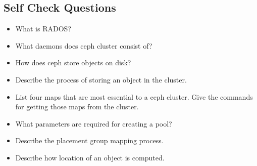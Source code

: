 \documentclass[12pt,a4paper]{report}
\begin{document}
\subsection{Self Check Questions}

\begin{itemize}
	\item What is RADOS?

	\item What daemons does ceph cluster consist of?

	\item How does ceph store objects on disk?

	\item Describe the process of storing an object in the cluster.

	\item List four maps that are most essential to a ceph cluster. Give
		the commands for getting those maps from the cluster.

	\item What parameters are required for creating a pool?

	\item Describe the placement group mapping process.

	\item Describe how location of an object is computed.
\end{itemize}
\end{document}
